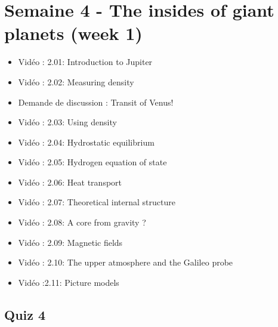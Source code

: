 




\section*{Semaine 4 - The insides of giant planets (week 1)}


\begin{itemize}[label={$\bullet$}]
    \item Vidéo : 2.01: Introduction to Jupiter
    \item Vidéo : 2.02: Measuring density
    \item Demande de discussion : Transit of Venus!
    \item Vidéo : 2.03: Using density
    \item Vidéo : 2.04: Hydrostatic equilibrium
    \item Vidéo : 2.05: Hydrogen equation of state
    \item Vidéo : 2.06: Heat transport
    \item Vidéo : 2.07: Theoretical internal structure
    \item Vidéo : 2.08: A core from gravity ?
    \item Vidéo : 2.09: Magnetic fields
    \item Vidéo : 2.10: The upper atmosphere and the Galileo probe
    \item Vidéo :2.11: Picture models
\end{itemize}

\subsection*{Quiz 4}

